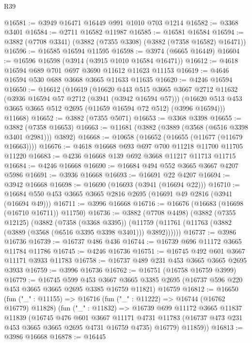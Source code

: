 \begin{lexlean}{R39}
\begin{coremodule}
@16581 := @3949 @16471 @16449 @991 @1010 @703 @1214
@16582 := @3368 @3401
@16584 := @2711 @16582 @11987
@16585 := @16581 @16584
@16594 := @3882 (@7708 @3341) (@3882 (@7355 @3308) (@3882 (@7358 @16582) @16471))
@16596 := @16585 @16594 @11595
@16598 := @3974 (@6665 @16449)
@16604 := @16596 @16598 (@3914 (@3915 @1010 @16584 @16471))
@16612 := @4618 @16594 @689 @701 @697 @3690 @11612 @11623 @11153
@16619 := @4646 @16594 @530 @688 @3668 @3665 @11633 @11635
@16620 := @4246 @16594
@16650 := @16612
    (@16619
      (@16620
        @443
        @515
        @3665
        @3667
        @2712
        @11632
        (@3936 @16594 @57 @2712 (@3941 (@3942 @16594 @57)))
        (@16620 @513 @453 @3665 @3665 @512 @2695 (@11659 @16594 @72 @512) (@3996 @16594)))
      @11668)
@16652 := @3882 (@7355 @5071)
@16653 := @3368 @3398
@16655 := @3882 (@7358 @16653)
@16663 := @11681 (@3882 (@3889 (@3568 (@6516 @3398 @3401 @2981))) @3892)
@16668 := @10658 (@16652 (@16655 (@11677 (@11679 @16663))))
@16676 := @4618 @16668 @693 @697 @700 @11218 @11700 @11705 @11220
@16683 := @4236 @16668 @139 @692 @3668 @11217 @11713 @11715
@16684 := @4246 @16668
@16690 := @16684 @494 @552 @3665 @3667 @4207 @5986
@16691 := @3936 @16668
@16693 := @16691 @22 @4207
@16694 := @3942 @16668
@16698 := @16690 (@16693 (@3941 (@16694 @22)))
@16710 := @16684 @550 @453 @3665 @3665 @2816 @2695 (@16691 @49 @2816 (@3941 (@16694 @49)))
@16711 := @3996 @16668
@16716 := @16676 (@16683 (@16698 (@16710 @16711)) @11750)
@16736 := @3882
    (@7708 @4498)
    (@3882
      (@7355 @12125)
      (@3882
        (@7358 (@3368 @3395))
        (@11759 (@11761 (@11763 (@3882 (@3889 (@3568 (@6516 @3395 @3398 @3401))) @3892))))))
@16737 := @3986 @16736
@16739 := @16737 @486 @436
@16744 := @16739 @696 @11172 @3665 @11784 @11786
@16745 := @4246 @16736
@16751 := @16745 @492 @601 @3667 @11171 @3933 @11783
@16758 := @16737 @489 @231 @453 @3665 @3665 @2695 @3933
@16759 := @3996 @16736
@16762 := @16751 (@16758 @16759 @3999)
@16779 := @16745
    @599
    @453
    @3667
    @3665
    @3385
    @2695
    (@16737 @596 @220 @453 @3665 @3665 @2695 @3385 @16759 @11821)
    @16759
@16812 := @16650
    (fun ("_" : @11155) =>
    @16716
      (fun ("_" : @11222) => @16744 (@16762 @16779) @11828)
      (fun ("_" : @11832) =>
      @16739
        @699
        @11172
        @3665
        @11837
        @11839
        (@16745
          @476
          @601
          @3667
          @11171
          @4731
          @11783
          (@16737 @473 @231 @453 @3665 @3665 @2695 @4731 @16759 @4735)
          @16779)
        @11859))
@16813 := @3986 @16668
@16878 := @16445

\end{coremodule}
\end{lexlean}
